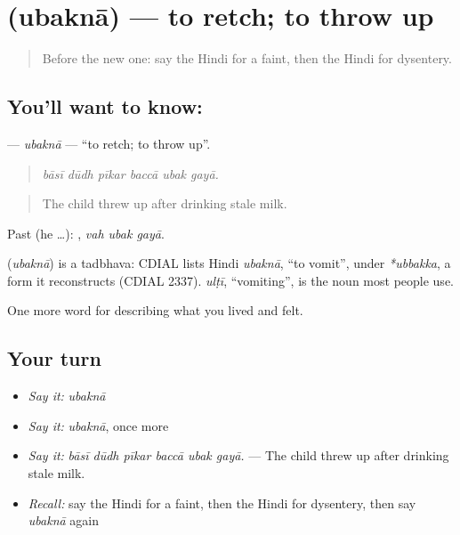 \section[\texorpdfstring{\hi{उबकना} (ubaknā)}{उबकना (ubaknā)}]{ (ubaknā) — to retch; to throw up}

\label{lesson:HI-C485-ubakna}



\begin{quote}
Before the new one: say the Hindi for a faint, then the Hindi for dysentery.
\end{quote}

\subsection*{You'll want to know: }
\textbf{} — \emph{ubaknā} — \textquotedblleft{}to retch; to throw up\textquotedblright{}.

\begin{quote}
     
\end{quote}

\begin{quote}
\emph{bāsī dūdh pīkar baccā ubak gayā.}
\end{quote}

\begin{quote}
The child threw up after drinking stale milk.
\end{quote}

Past (he …):   , \emph{vah ubak gayā}.

\begin{cousinweb}
\textbf{} (\emph{ubaknā}) is a tadbhava: CDIAL lists Hindi \emph{ubaknā}, \textquotedblleft{}to vomit\textquotedblright{}, under \emph{*ubbakka}, a form it reconstructs (CDIAL 2337). \emph{ulṭī}, \textquotedblleft{}vomiting\textquotedblright{}, is the noun most people use.
\end{cousinweb}

\begin{grammarlens}[title={What you've built}]
One more word for describing what you lived and felt.
\end{grammarlens}

\subsection*{Your turn}
\begin{itemize}
\raggedright
  \item \emph{Say it:} \emph{ubaknā}
  \item \emph{Say it:} \emph{ubaknā}, once more
  \item \emph{Say it:} \emph{bāsī dūdh pīkar baccā ubak gayā.} — The child threw up after drinking stale milk.
  \item \emph{Recall:} say the Hindi for a faint, then the Hindi for dysentery, then say \emph{ubaknā} again
\end{itemize}

